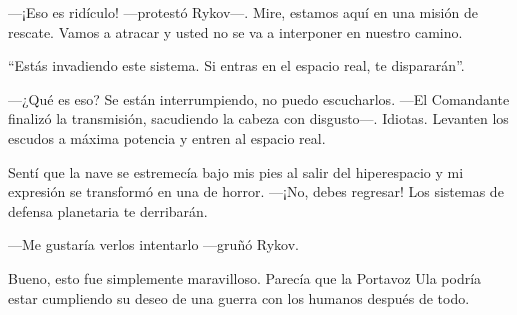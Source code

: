 —¡Eso es ridículo! —protestó Rykov—. Mire, estamos aquí en una misión de rescate. Vamos a atracar y usted no se va a interponer en nuestro camino.

``Estás invadiendo este sistema. Si entras en el espacio real, te dispararán''.

—¿Qué es eso? Se están interrumpiendo, no puedo escucharlos. —El Comandante finalizó la transmisión, sacudiendo la cabeza con disgusto—. Idiotas. Levanten los escudos a máxima potencia y entren al espacio real.

Sentí que la nave se estremecía bajo mis pies al salir del hiperespacio y mi expresión se transformó en una de horror. —¡No, debes regresar! Los sistemas de defensa planetaria te derribarán.

—Me gustaría verlos intentarlo —gruñó Rykov.

Bueno, esto fue simplemente maravilloso. Parecía que la Portavoz Ula podría estar cumpliendo su deseo de una guerra con los humanos después de todo.